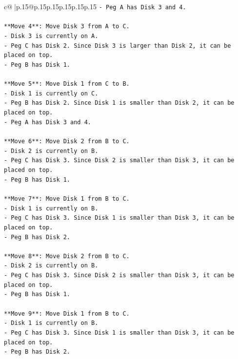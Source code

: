 \documentclass{article}
\begin{document}
{\begin{supertabular}{c@{$\;$}|p{.15\linewidth}@{}p{.15\linewidth}p{.15\linewidth}p{.15\linewidth}p{.15\linewidth}p{.15\linewidth}}
{{{\texttt{{-} Peg A has Disk 3 and 4.} \\
\\ 
\texttt{**Move 4**: Move Disk 3 from A to C.} \\
\texttt{{-} Disk 3 is currently on A.} \\
\texttt{{-} Peg C has Disk 2. Since Disk 3 is larger than Disk 2, it can be placed on top.} \\
\texttt{{-} Peg B has Disk 1.} \\
\\ 
\texttt{**Move 5**: Move Disk 1 from C to B.} \\
\texttt{{-} Disk 1 is currently on C.} \\
\texttt{{-} Peg B has Disk 2. Since Disk 1 is smaller than Disk 2, it can be placed on top.} \\
\texttt{{-} Peg A has Disk 3 and 4.} \\
\\ 
\texttt{**Move 6**: Move Disk 2 from B to C.} \\
\texttt{{-} Disk 2 is currently on B.} \\
\texttt{{-} Peg C has Disk 3. Since Disk 2 is smaller than Disk 3, it can be placed on top.} \\
\texttt{{-} Peg B has Disk 1.} \\
\\ 
\texttt{**Move 7**: Move Disk 1 from B to C.} \\
\texttt{{-} Disk 1 is currently on B.} \\
\texttt{{-} Peg C has Disk 3. Since Disk 1 is smaller than Disk 3, it can be placed on top.} \\
\texttt{{-} Peg B has Disk 2.} \\
\\ 
\texttt{**Move 8**: Move Disk 2 from B to C.} \\
\texttt{{-} Disk 2 is currently on B.} \\
\texttt{{-} Peg C has Disk 3. Since Disk 2 is smaller than Disk 3, it can be placed on top.} \\
\texttt{{-} Peg B has Disk 1.} \\
\\ 
\texttt{**Move 9**: Move Disk 1 from B to C.} \\
\texttt{{-} Disk 1 is currently on B.} \\
\texttt{{-} Peg C has Disk 3. Since Disk 1 is smaller than Disk 3, it can be placed on top.} \\
\texttt{{-} Peg B has Disk 2.} \\
}}}
\end{supertabular}}
\end{document}
